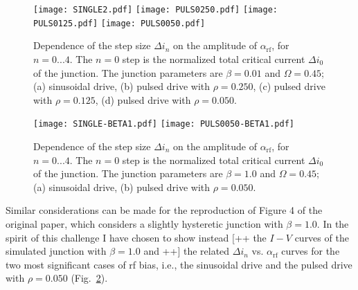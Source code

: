 \begin{figure}[!p]
	\centering
	\texttt{[image: SINGLE2.pdf]}
	\texttt{[image: PULS0250.pdf]}
	\texttt{[image: PULS0125.pdf]}
	\texttt{[image: PULS0050.pdf]}
	\caption{Dependence of the step size $\Delta i_n$ on the amplitude of  $\alpha_\mathrm{rf}$, for $n = 0. . . 4$. The $n = 0$ step is the normalized total critical current $\Delta i_0$ of the junction. The junction parameters are $\beta = 0. 01$ and $\Omega = 0. 45$; (a) sinusoidal drive, (b) pulsed drive with $\rho = 0. 250$, (c) pulsed drive with $\rho = 0. 125$, (d) pulsed drive with $\rho = 0. 050$.}
	\label{fig:step-width}
\end{figure}

\begin{figure}[t]
	\centering
	\texttt{[image: SINGLE-BETA1.pdf]}
	\texttt{[image: PULS0050-BETA1.pdf]}
	\caption{Dependence of the step size $\Delta i_n$ on the amplitude of  $\alpha_\mathrm{rf}$, for $n = 0. . . 4$. The $n = 0$ step is the normalized total critical current $\Delta i_0$ of the junction. The junction parameters are $\beta = 1.0$ and $\Omega = 0. 45$; (a) sinusoidal drive, (b) pulsed drive with $\rho = 0. 050$.}
	\label{fig:step-width-beta1}
\end{figure}

Similar considerations can be made for the reproduction of Figure 4 of the original paper, which considers a slightly hysteretic junction with $\beta = 1.0$. In the spirit of this challenge I have chosen to show instead [++ the $I - V$ curves of the simulated junction with $\beta = 1.0$ and ++] the related $\Delta i_n$ vs. $\alpha_\mathrm{rf}$ curves for the two most significant cases of rf bias, i.e., the sinusoidal drive and the pulsed drive with $\rho = 0.050$ (Fig.~\ref{fig:step-width-beta1}).




